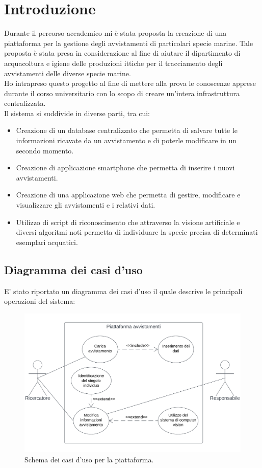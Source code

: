 \documentclass[a4paper,final,12pt]{report}
\begin{document}
\restoregeometry



\tableofcontents
\setlength{\parindent}{0pt}
\chapter{Introduzione}
Durante il percorso accademico mi è stata proposta la creazione di una piattaforma per la gestione degli avvistamenti di particolari specie marine. Tale proposta è stata presa in considerazione al fine di aiutare il dipartimento di acquacoltura e igiene delle produzioni ittiche per il tracciamento degli avvistamenti delle diverse specie marine.\\
Ho intrapreso questo progetto al fine di mettere alla prova le conoscenze apprese durante il corso universitario con lo scopo di creare un'intera infrastruttura centralizzata.\\
Il sistema si suddivide in diverse parti, tra cui:
\begin{itemize}
\item Creazione di un database centralizzato che permetta di salvare tutte le informazioni ricavate da un avvistamento e di poterle modificare in un secondo momento.
\item Creazione di applicazione smartphone che permetta di inserire i nuovi avvistamenti.
\item Creazione di una applicazione web che permetta di gestire, modificare e visualizzare gli avvistamenti e i relativi dati.
\item Utilizzo di script di riconoscimento che attraverso la visione artificiale e diversi algoritmi noti permetta di individuare la specie precisa di determinati esemplari acquatici.
\end{itemize}

\section{Diagramma dei casi d'uso}
E' stato riportato un diagramma dei casi d'uso il quale descrive le principali operazioni del sistema:

\begin{figure}[hbtp]
\centering
\includegraphics[scale=0.6]{img_concettuale/casi.png}
\caption{Schema dei casi d'uso per la piattaforma.}
\end{figure}
\end{document}
